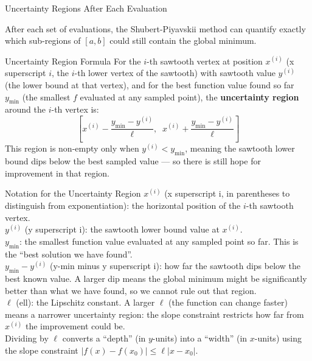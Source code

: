 \documentclass[aspectratio=169,10pt]{beamer}
\begin{document}
\begin{frame}[allowframebreaks]{Uncertainty Regions After Each Evaluation}

  After each set of evaluations, the Shubert-Piyavskii method can quantify
  exactly which sub-regions of $[a, b]$ could still contain the global
  minimum.

  \begin{block}{Uncertainty Region Formula}
    For the $i$-th sawtooth vertex at position $x^{(i)}$ (x superscript $i$,
    the $i$-th lower vertex of the sawtooth) with sawtooth value $y^{(i)}$
    (the lower bound at that vertex), and for the best function value found so
    far $y_{\min}$ (the smallest $f$ evaluated at any sampled point), the
    \textbf{uncertainty region} around the $i$-th vertex is:
    \[
      \left[
        x^{(i)} - \frac{y_{\min} - y^{(i)}}{\ell},
        \;\;
        x^{(i)} + \frac{y_{\min} - y^{(i)}}{\ell}
      \right]
    \]
    This region is non-empty only when $y^{(i)} < y_{\min}$, meaning the
    sawtooth lower bound dips below the best sampled value --- so there is
    still hope for improvement in that region.
  \end{block}

  \begin{block}{Notation for the Uncertainty Region}
    $x^{(i)}$ (x superscript i, in parentheses to distinguish from
    exponentiation): the horizontal position of the $i$-th sawtooth vertex.\\
    $y^{(i)}$ (y superscript i): the sawtooth lower bound value at $x^{(i)}$.\\
    $y_{\min}$: the smallest function value evaluated at any sampled point so far.
    This is the ``best solution we have found''.\\
    $y_{\min} - y^{(i)}$ (y-min minus y superscript i): how far the sawtooth
    dips below the best known value.  A larger dip means the global minimum
    might be significantly better than what we have found, so we cannot rule
    out that region.\\
    $\ell$ (ell): the Lipschitz constant.  A larger $\ell$ (the function can
    change faster) means a narrower uncertainty region: the slope constraint
    restricts how far from $x^{(i)}$ the improvement could be.\\
    Dividing by $\ell$ converts a ``depth'' (in $y$-units) into a
    ``width'' (in $x$-units) using the slope constraint $|f(x) - f(x_0)|
    \le \ell |x - x_0|$.
  \end{block}


\end{frame}
\end{document}
